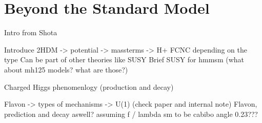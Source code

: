 \section{Beyond the Standard Model}
Intro from Shota 

Introduce 2HDM -> potential -> massterms -> H+
FCNC depending on the type
Can be part of other theories like SUSY
Brief SUSY for hmmsm 
(what about mh125 models? what are those?)

Charged Higgs phenomenlogy (production and decay)

Flavon -> types of mechanisms -> U(1) (check paper and internal note)
Flavon, prediction and decay aswell?
assuming f / lambda sm to be cabibo angle 0.23???
